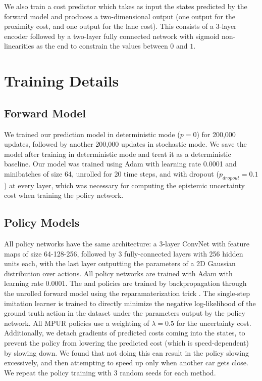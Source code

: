 \documentclass{article} %
\begin{document}
We also train a cost predictor which takes as input the states predicted by the forward model and produces a two-dimensional output (one output for the proximity cost, and one output for the lane cost). 
This consists of a 3-layer encoder followed by a two-layer fully connected network with sigmoid non-linearities as the end to constrain the values between $0$ and $1$. 



    \section{Training Details}
    \label{training-details-appendix}

    \subsection{Forward Model}
    We trained our prediction model in deterministic mode ($p=0$) for 200,000 updates, followed by another 200,000 updates in stochastic mode.
    We save the model after training in deterministic mode and treat it as a deterministic baseline.
    Our model was trained using Adam \citep{ADAM} with learning rate 0.0001 and minibatches of size 64, unrolled for 20 time steps, and with dropout ($p_{dropout}=0.1$) at every layer, which was necessary for computing the epistemic uncertainty cost when training the policy network.

    \subsection{Policy Models}

    All policy networks have the same architecture: a 3-layer ConvNet with feature maps of size 64-128-256, followed by 3 fully-connected layers with 256 hidden units each, with the last layer outputting the parameters of a 2D Gaussian distribution over actions. All policy networks are trained with Adam with learning rate 0.0001. The \modelnameil and \modelnamedrop policies are trained by backpropagation through the unrolled forward model using the reparamaterization trick \citep{VAE}. The single-step imitation learner is trained to directly minimize the negative log-likelihood of the ground truth action in the dataset under the parameters output by the policy network. All MPUR policies use a weighting of $\lambda=0.5$ for the uncertainty cost. Additionally, we detach gradients of predicted costs coming into the states, to prevent the policy from lowering the predicted cost (which is speed-dependent) by slowing down. We found that not doing this can result in the policy slowing excessively, and then attempting to speed up only when another car gets close. We repeat the policy training with 3 random seeds for each method. 
    
\end{document}
